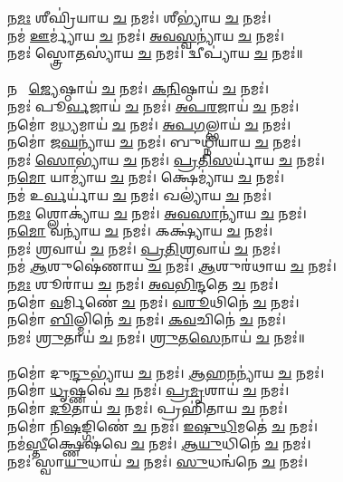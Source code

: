 𑌨\ul{𑌮𑌃} 𑌶𑍀𑌘𑍍𑌰𑌿॑𑌯𑌾𑌯 \ul{𑌚} 𑌨𑌮𑌃॑। 𑌶𑍀𑌭𑍍𑌯𑌾॑𑌯 \ul{𑌚} 𑌨𑌮𑌃॑। \\
𑌨𑌮॑ \ul{𑌊}𑌰𑍍𑌮𑍍𑌯𑌾॑𑌯 \ul{𑌚} 𑌨𑌮𑌃॑। \ul{𑌅}\ul{𑌵}\ul{𑌸𑍍𑌵}𑌨𑍍𑌯𑌾॑𑌯 \ul{𑌚} 𑌨𑌮𑌃॑। \\
𑌨𑌮𑌃॑ 𑌸𑍍𑌤𑍍𑌰𑍋\ul{𑌤}𑌸𑍍𑌯𑌾॑𑌯 \ul{𑌚} 𑌨𑌮𑌃॑। 𑌦𑍍𑌵𑍀𑌪𑍍𑌯𑌾॑𑌯 \ul{𑌚} 𑌨𑌮𑌃॑॥\\
\\
𑌨𑌮𑍋᳚ \ul{𑌜𑍍𑌯𑍇}𑌷𑍍𑌠𑌾𑌯॑ \ul{𑌚} 𑌨𑌮𑌃॑। \ul{𑌕}\ul{𑌨𑌿}𑌷𑍍𑌠𑌾𑌯॑ \ul{𑌚} 𑌨𑌮𑌃॑। \\
𑌨𑌮𑌃॑ 𑌪𑍂\ul{𑌰𑍍𑌵}𑌜𑌾𑌯॑ \ul{𑌚} 𑌨𑌮𑌃॑। \ul{𑌅}\ul{𑌪}\ul{𑌰}𑌜𑌾𑌯॑ \ul{𑌚} 𑌨𑌮𑌃॑। \\
𑌨𑌮𑍋॑ 𑌮\ul{𑌧𑍍𑌯}𑌮𑌾𑌯॑ \ul{𑌚} 𑌨𑌮𑌃॑। \ul{𑌅}\ul{𑌪}\ul{𑌗}𑌲𑍍𑌭𑌾𑌯॑ \ul{𑌚} 𑌨𑌮𑌃॑। \\
𑌨𑌮𑍋॑ 𑌜\ul{𑌘}𑌨𑍍𑌯𑌾॑𑌯 \ul{𑌚} 𑌨𑌮𑌃॑। 𑌬𑍁𑌧𑍍𑌨𑌿॑𑌯𑌾𑌯 \ul{𑌚} 𑌨𑌮𑌃॑।\\
𑌨𑌮𑌃॑ \ul{𑌸𑍋}𑌭𑍍𑌯𑌾॑𑌯 \ul{𑌚} 𑌨𑌮𑌃॑। \ul{𑌪𑍍𑌰}\ul{𑌤𑌿}\ul{𑌸}𑌰𑍍𑌯𑌾॑𑌯 \ul{𑌚} 𑌨𑌮𑌃॑। \\
𑌨\ul{𑌮𑍋} 𑌯𑌾𑌮𑍍𑌯𑌾॑𑌯 \ul{𑌚} 𑌨𑌮𑌃॑। 𑌕𑍍𑌷𑍇𑌮𑍍𑌯𑌾॑𑌯 \ul{𑌚} 𑌨𑌮𑌃॑। \\
𑌨𑌮॑ 𑌉\ul{𑌰𑍍𑌵}𑌰𑍍𑌯𑌾॑𑌯 \ul{𑌚} 𑌨𑌮𑌃॑। 𑌖𑌲𑍍𑌯𑌾॑𑌯 \ul{𑌚} 𑌨𑌮𑌃॑। \\
𑌨\ul{𑌮𑌃} 𑌶𑍍𑌲𑍋𑌕𑍍𑌯𑌾॑𑌯 \ul{𑌚} 𑌨𑌮𑌃॑। \ul{𑌅}\ul{𑌵}\ul{𑌸𑌾}𑌨𑍍𑌯𑌾॑𑌯 \ul{𑌚} 𑌨𑌮𑌃॑। \\
𑌨\ul{𑌮𑍋} 𑌵𑌨𑍍𑌯𑌾॑𑌯 \ul{𑌚} 𑌨𑌮𑌃॑। 𑌕𑌕𑍍𑌷𑍍𑌯𑌾॑𑌯 \ul{𑌚} 𑌨𑌮𑌃॑। \\
𑌨𑌮𑌃॑ \ul{𑌶𑍍𑌰}𑌵𑌾𑌯॑ \ul{𑌚} 𑌨𑌮𑌃॑। \ul{𑌪𑍍𑌰}\ul{𑌤𑌿}\ul{𑌶𑍍𑌰}𑌵𑌾𑌯॑ \ul{𑌚} 𑌨𑌮𑌃॑। \\
𑌨𑌮॑ \ul{𑌆}𑌶𑍁𑌷𑍇॑𑌣𑌾𑌯 \ul{𑌚} 𑌨𑌮𑌃॑। \ul{𑌆}𑌶𑍁𑌰॑𑌥𑌾𑌯 \ul{𑌚} 𑌨𑌮𑌃॑। \\
𑌨\ul{𑌮𑌃} 𑌶𑍂𑌰𑌾॑𑌯 \ul{𑌚} 𑌨𑌮𑌃॑। \ul{𑌅}\ul{𑌵}\ul{𑌭𑌿}\ul{𑌨𑍍𑌦}𑌤𑍇 \ul{𑌚} 𑌨𑌮𑌃॑। \\
𑌨𑌮𑍋॑ \ul{𑌵}𑌰𑍍𑌮𑌿𑌣𑍇॑ \ul{𑌚} 𑌨𑌮𑌃॑। \ul{𑌵}\ul{𑌰𑍂}𑌥𑌿𑌨𑍇॑ \ul{𑌚} 𑌨𑌮𑌃॑। \\
𑌨𑌮𑍋॑ \ul{𑌬𑌿}𑌲𑍍𑌮𑌿𑌨𑍇॑ \ul{𑌚} 𑌨𑌮𑌃॑। \ul{𑌕}\ul{𑌵}𑌚𑌿𑌨𑍇॑ \ul{𑌚} 𑌨𑌮𑌃॑। \\
𑌨𑌮𑌃॑ \ul{𑌶𑍍𑌰𑍁}𑌤𑌾𑌯॑ \ul{𑌚} 𑌨𑌮𑌃॑। \ul{𑌶𑍍𑌰𑍁}\ul{𑌤}\ul{𑌸𑍇}𑌨𑌾𑌯॑ \ul{𑌚} 𑌨𑌮𑌃॑॥ \\
\\
𑌨𑌮𑍋॑ 𑌦𑍁\ul{𑌨𑍍𑌦𑍁}𑌭𑍍𑌯𑌾॑𑌯 \ul{𑌚} 𑌨𑌮𑌃॑। \ul{𑌆}\ul{𑌹}\ul{𑌨}𑌨𑍍𑌯𑌾॑𑌯 \ul{𑌚} 𑌨𑌮𑌃॑। \\
𑌨𑌮𑍋॑ \ul{𑌧𑍃}𑌷𑍍𑌣𑌵𑍇॑ \ul{𑌚} 𑌨𑌮𑌃॑। \ul{𑌪𑍍𑌰}\ul{𑌮𑍃}𑌶𑌾𑌯॑ \ul{𑌚} 𑌨𑌮𑌃॑।\\
𑌨𑌮𑍋॑ \ul{𑌦𑍂}𑌤𑌾𑌯॑ \ul{𑌚} 𑌨𑌮𑌃॑। 𑌪𑍍𑌰𑌹𑌿॑𑌤𑌾𑌯 \ul{𑌚} 𑌨𑌮𑌃॑। \\
𑌨𑌮𑍋॑ 𑌨𑌿\ul{𑌷}𑌙𑍍𑌗𑌿𑌣𑍇॑ \ul{𑌚} 𑌨𑌮𑌃॑। \ul{𑌇}\ul{𑌷𑍁}\ul{𑌧𑌿}𑌮𑌤𑍇॑ \ul{𑌚} 𑌨𑌮𑌃॑।\\
𑌨𑌮॑\ul{𑌸𑍍𑌤𑍀}𑌕𑍍𑌷𑍍𑌣𑍇𑌷॑𑌵𑍇 \ul{𑌚} 𑌨𑌮𑌃॑। \ul{𑌆}\ul{𑌯𑍁}𑌧𑌿𑌨𑍇॑ \ul{𑌚} 𑌨𑌮𑌃॑। \\
𑌨𑌮𑌃॑ 𑌸𑍍𑌵𑌾\ul{𑌯𑍁}𑌧𑌾𑌯॑ \ul{𑌚} 𑌨𑌮𑌃॑। \ul{𑌸𑍁}𑌧𑌨𑍍𑌵॑𑌨𑍇 \ul{𑌚} 𑌨𑌮𑌃॑।\\
